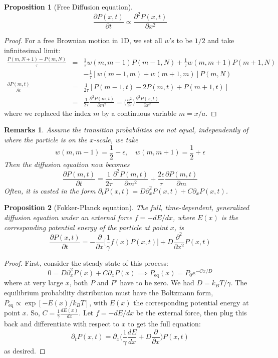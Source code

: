\documentclass[a4paper]{article}
\newtheorem{remarks}{Remarks}[section]
\theoremstyle{new}
\newtheorem{prop}{Proposition}[section]
\begin{document}
\begin{prop}[Free Diffusion equation]
$$\frac{\partial P(x,t)}{\partial t}\propto\frac{\partial^2P(x,t)}{\partial x^2}$$
\end{prop}
\begin{proof}
For a free Brownian motion in 1D, we set all $w$'s to be $1/2$ and take infinitesimal limit:
\begin{eqnarray}
\frac{P(m,N+1)-P(m,N)}{\tau}&=&\frac{1}{\tau}w(m,m-1)P(m-1,N)+\frac{1}{\tau}w(m,m+1)P(m+1,N)\nonumber\\&&-\frac{1}{\tau}[w(m-1,m)+w(m+1,m)]P(m,N)\nonumber\\\frac{\partial P(m,t)}{\partial t}&=&\frac{1}{2\tau}[P(m-1,t)-2P(m,t)+P(m+1,t)]\nonumber\\&=&\frac{1}{2\tau}\frac{\partial^2P(m,t)}{\partial m^2}=\bigg(\frac{a^2}{2\tau}\bigg)\frac{\partial^2P(x,t)}{\partial x^2}\nonumber
\end{eqnarray}
where we replaced the index $m$ by a continuous variable $m=x/a$.
\end{proof}
\begin{remarks}
Assume the transition probabilities are not equal, independently of where the particle is on the $x$-scale, we take
$$w(m,m-1)=\frac{1}{2}-\epsilon,\quad w(m,m+1)=\frac{1}{2}+\epsilon$$
Then the diffusion equation now becomes
$$\frac{\partial P(m,t)}{\partial t}=\frac{1}{2\tau}\frac{\partial^2P(m,t)}{\partial m^2}+\frac{2\epsilon}{\tau}\frac{\partial P(m,t)}{\partial m}$$
Often, it is casted in the form $\partial_tP(x,t)=D\partial_x^2P(x,t)+C\partial_xP(x,t)$. 
\end{remarks}
\begin{prop}[Fokker-Planck equation]
The full, time-dependent, generalized diffusion equation under an external force $f=-dE/dx$, where $E(x)$ is the corresponding potential energy of the particle at point $x$, is
$$\frac{\partial P(x,t)}{\partial t}=-\frac{\partial}{\partial x}\bigg[\frac{1}{\gamma}f(x)P(x,t)\bigg]+D\frac{\partial^2}{\partial x^2}P(x,t)$$
\end{prop}
\begin{proof}
First, consider the steady state of this process:
$$0=D\partial_x^2P(x)+C\partial_xP(x)\implies P_{\text{eq}}(x)=P_0e^{-Cx/D}$$
where at very large $x$, both $P$ and $P'$ have to be zero. We had $D=k_BT/\gamma$. The equilibrium probability distribution must have the Boltzmann form, $P_{\text{eq}}\propto\exp[-E(x)/k_BT]$, with $E(x)$ the corresponding potential energy at point $x$. So, $C=\frac{1}{\gamma}\frac{dE(x)}{dx}$. Let $f=-dE/dx$ be the external force, then plug this back and differentiate with respect to $x$ to get the full equation:
$$\partial_tP(x,t)=\partial_x\bigg(\frac{1}{\gamma}\frac{dE}{dx}+D\frac{\partial}{\partial x}\bigg)P(x,t)$$
as desired.
\end{proof}
\end{document}
